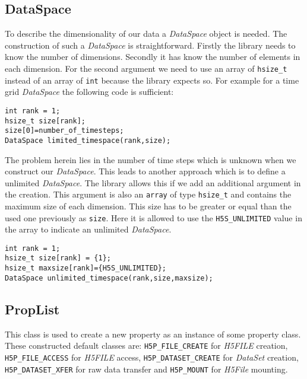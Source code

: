 \documentclass{article}
\begin{document}
\subsection{DataSpace}
To describe the dimensionality of our data a \textit{DataSpace} object is needed. The construction of such a \textit{DataSpace} is straightforward. Firstly the library needs to know the number of dimensions. Secondly it has know the number of elements in each dimension. For the second argument we need to use an array of \texttt{hsize\_t} instead of an array of \texttt{int} because the library expects so. For example for a time grid \textit{DataSpace} the following code is sufficient:\\
\begin{lstlisting}
int rank = 1;
hsize_t size[rank];
size[0]=number_of_timesteps;
DataSpace limited_timespace(rank,size);
\end{lstlisting}
The problem herein lies in the number of time steps which is unknown when we construct our \textit{DataSpace}. This leads to another approach which is to define a unlimited \textit{DataSpace}. The library allows this if we add an additional argument in the creation. This argument is also an \texttt{array} of type \texttt{hsize\_t} and contains the maximum size of each dimension. This size has to be greater or equal than the used one previously as \texttt{size}. Here it is allowed to use the \texttt{H5S\_UNLIMITED} value in the array to indicate an unlimited \textit{DataSpace}.
\begin{lstlisting}
int rank = 1;
hsize_t size[rank] = {1};
hsize_t maxsize[rank]={H5S_UNLIMITED};
DataSpace unlimited_timespace(rank,size,maxsize);
\end{lstlisting}

\subsection{PropList}
This class is used to create a new property as an instance of some property class. These constructed default classes are: \texttt{H5P\_FILE\_CREATE} for \textit{H5FILE} creation, \texttt{H5P\_FILE\_ACCESS} for \textit{H5FILE} access, \texttt{H5P\_DATASET\_CREATE} for \textit{DataSet} creation, \texttt{H5P\_DATASET\_XFER} for raw data transfer and \texttt{H5P\_MOUNT} for \textit{H5File} mounting.
\end{document}
